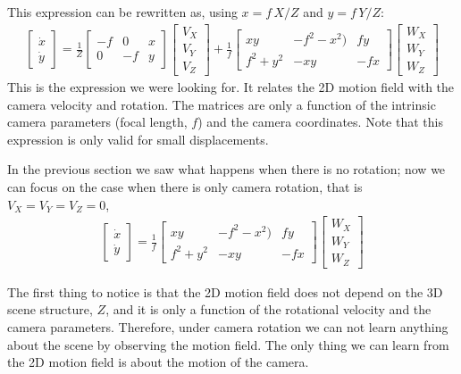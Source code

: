 This expression can be rewritten as, using $x=f \, X/Z$ and $y=f \, Y/Z$:
\begin{align}
\begin{bmatrix}
\dot{x} \\
\dot{y}
\end{bmatrix}
= \frac{1}{Z}
\begin{bmatrix}
-f & 0 & x \\
0 & -f & y  
\end{bmatrix}
\begin{bmatrix}
V_X\\
V_Y \\
V_Z 
\end{bmatrix}
+
\frac{1}{f}
\begin{bmatrix}
xy & -f^2-x^2) & f y \\
f^2+y^2 & -xy & -f x  
\end{bmatrix}
\begin{bmatrix}
W_X\\
W_Y \\
W_Z 
\end{bmatrix}
\label{eq:2d_motion_field_from_translation_and_rotation}
\end{align}
This is the expression we were looking for. It relates the 2D motion field with the camera velocity and rotation. The matrices are only a function of the intrinsic camera parameters (focal length, $f$) and the camera coordinates. Note that this expression is only valid for small displacements. 

In the previous section we saw what happens when there is no rotation; now we can focus on the case when there is only camera rotation, that is $V_X=V_Y=V_Z=0$, 
\begin{align}
\begin{bmatrix}
\dot{x} \\
\dot{y}
\end{bmatrix}
= 
\frac{1}{f}
\begin{bmatrix}
xy & -f^2-x^2) & f y \\
f^2+y^2 & -xy & -f x  
\end{bmatrix}
\begin{bmatrix}
W_X\\
W_Y \\
W_Z 
\end{bmatrix}
\end{align}

The first thing to notice is that the 2D motion field does not depend on the 3D scene structure, $Z$, and it is only a function of the rotational velocity and the camera parameters. Therefore, under camera rotation we can not learn anything about the scene by observing the motion field. The only thing we can learn from the 2D motion field is about the motion of the camera. 


